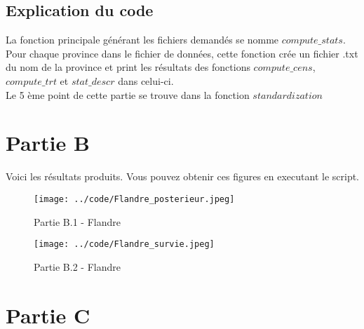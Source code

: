 \documentclass{article}
\begin{document}
\subsection{Explication du code}

La fonction principale générant les fichiers demandés se nomme $compute\_stats$. Pour chaque province dans le fichier de données, cette fonction crée un fichier .txt du nom de la province et print les résultats des fonctions $compute\_cens$, $compute\_trt$ et $stat\_descr$ dans celui-ci. \\
Le 5 ème point de cette partie se trouve dans la fonction $standardization$

\section{Partie B}
Voici les résultats produits. Vous pouvez obtenir ces figures en executant le script.


\begin{figure}[!h]
   \begin{minipage}[c]{.46\linewidth}
	\texttt{[image: ../code/Flandre\_posterieur.jpeg]}
	\caption{Partie B.1 - Flandre}
   \end{minipage} \hfill
   \begin{minipage}[c]{.46\linewidth}
	\texttt{[image: ../code/Flandre\_survie.jpeg]}
	\caption{Partie B.2 - Flandre}
   \end{minipage}
\end{figure}

\section{Partie C}
\end{document}
